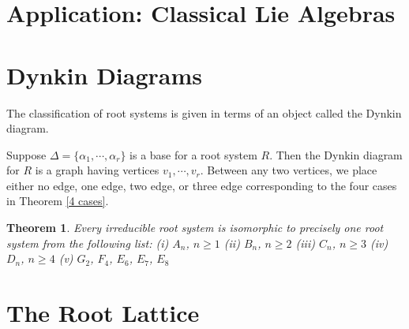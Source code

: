 \documentclass{article}
\newtheorem{theorem}{Theorem}[section]
\theoremstyle{definition}
\begin{document}
\section{Application: Classical Lie Algebras}



\section{Dynkin Diagrams}
The classification of root systems is given in terms of an object called the Dynkin diagram.

Suppose $\Delta=\{\alpha_1,\cdots,\alpha_r\}$ is a base for a root system $R$.
Then the Dynkin diagram for $R$ is a graph having vertices $v_1,\cdots,v_r$.
Between any two vertices, we place either no edge, one edge, two edge, or three edge corresponding to the four cases in Theorem \ref{4 cases}.


\begin{theorem}
    Every irreducible root system is isomorphic to precisely one root system from the following list:\newline 
    (i) $A_n$, $n\ge 1$ \newline 
    (ii) $B_n$, $n\ge 2$\newline 
    (iii) $C_n$, $n\ge 3$\newline 
    (iv) $D_n$, $n\ge 4$\newline 
    (v) $G_2$, $F_4$, $E_6$, $E_7$, $E_8$
\end{theorem}

\section{The Root Lattice}
\end{document}
